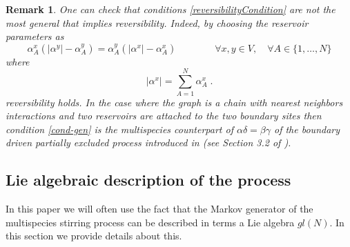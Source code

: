 \documentclass[10pt]{article}
\numberwithin{equation}{section}
\numberwithin{equation}{subsection}
\newtheorem{remark}{Remark}
\newcommand{\dt}{\;.}
\begin{document}
\begin{remark}
\label{rem-rev}
		{One can check that conditions \eqref{reversibilityCondition} are not the most general that implies reversibility. Indeed, by choosing the reservoir parameters as }
		\begin{equation}
		\label{cond-gen}
			\alpha_{A}^{x}\left(|\alpha^{y}|-\alpha_{A}^{y}\right)=\alpha_{A}^{y}\left(|\alpha^{x}|-\alpha_{A}^{x}\right)\qquad\qquad \forall x,y\in V,\quad \forall A\in \{1,\ldots,N\}
		\end{equation}
		where
		\begin{equation}
			|\alpha^{x}|=\sum_{A=1}^{N}\alpha_{A}^{x}\dt
		\end{equation}
		reversibility holds. 
		 In the case where the graph is a chain with nearest neighbors interactions and two reservoirs are attached to the two boundary sites
		then condition \eqref{cond-gen} is the multispecies counterpart of $\alpha\delta=\beta\gamma$ of the boundary driven partially excluded process introduced in \cite{schutzSandow} (see Section 3.2 of \cite{carinci2013duality}).
		\end{remark}
\subsection{Lie algebraic description of the process}

In this paper we will often use the fact that the Markov generator of the multispecies stirring process can be described in terms a Lie algebra ${gl}(N)$.
In this section we provide details about this.
\end{document}
